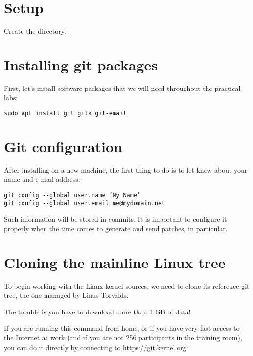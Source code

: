
\section{Setup}

Create the  directory.

\section{Installing git packages}

First, let's install software packages that we will need
throughout the practical labs:

\begin{verbatim}
sudo apt install git gitk git-email
\end{verbatim}

\section{Git configuration}

After installing  on a new machine, the first thing to do is
to let  know about your name and e-mail address:

\begin{verbatim}
git config --global user.name ’My Name’
git config --global user.email me@mydomain.net
\end{verbatim}

Such information will be stored in commits. It is important
to configure it properly when the time comes to generate and
send patches, in particular.

\section{Cloning the mainline Linux tree}

To begin working with the Linux kernel sources, we need to clone its
reference git tree, the one managed by Linus Torvalds.

The trouble is you have to download more than 1 GB of data!

If you are running this command from home, or if you have very fast
access to the Internet at work (and if you are not 256 participants in the
training room), you can do it directly by connecting to
\url{https://git.kernel.org}:


